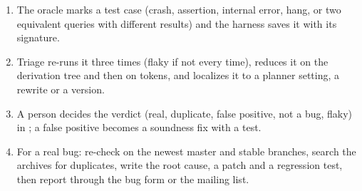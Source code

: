 \begin{enumerate}
  \item The oracle marks a test case (crash, assertion, internal error, hang,
    or two equivalent queries with different results) and the harness saves it
    with its signature.
  \item Triage re-runs it three times (flaky if not every time), reduces it on
    the derivation tree and then on tokens, and localizes it to a planner
    setting, a rewrite or a version.
  \item A person decides the verdict (real, duplicate, false positive, not a
    bug, flaky) in ; a false positive becomes a
    soundness fix with a test.
  \item For a real bug: re-check on the newest master and stable branches,
    search the archives for duplicates, write the root cause, a patch and a
    regression test, then report through the \pg bug form or the mailing list.
\end{enumerate}
